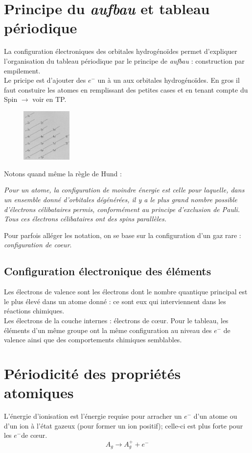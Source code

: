 \documentclass	[11pt, a4paper, openany]{book}
\begin{document}
\section{Principe du \textit{aufbau} et tableau périodique}
La configuration électroniques des orbitales hydrogénoïdes permet d'expliquer l'organisation du tableau périodique par le principe de \textit{aufbau} : construction par empilement.\\
Le pricipe est d'ajouter des $e^-$ un à un aux orbitales hydrogénoïdes. En gros il faut constuire les atomes en remplissant des petites cases et en tenant compte du Spin $\rightarrow$ voir en TP.\\
\begin{figure}
	\includegraphics[width=2.5cm]{image6.png}
\end{figure}
Notons quand même la règle de Hund : 

\textit{Pour un atome, la configuration de moindre énergie est celle pour laquelle, dans un ensemble donné d'orbitales dégénérées, il y a le plus grand nombre possible d'électrons célibataires permis, conformément au principe d'exclusion de Pauli. Tous ces électrons célibataires ont des spins parallèles.}

Pour parfois alléger les notation, on se base sur la configuration d'un gaz rare : \textit{configuration de coeur}.

\subsection{Configuration électronique des éléments}
Les électrons de valence sont les électrons dont le nombre quantique principal est le plus élevé dans un atome donné : ce sont eux qui interviennent dans les réactions chimiques.\\
Les électrons de la couche internes : électrons de cœur. Pour le tableau, les éléments d'un même groupe ont la même configuration au niveau des $e^-$ de valence ainsi que des comportements chimiques semblables.

\section{Périodicité des propriétés atomiques}
L'énergie d'ionisation est l'énergie requise pour arracher un $e^-$ d'un atome ou d'un ion à l'état gazeux  (pour former un ion positif); celle-ci est plus forte pour les $e^-$de cœur.
$$A_g \rightarrow A_g^+ + e^-$$
\end{document}
